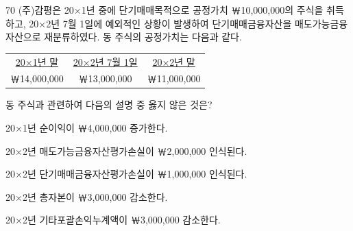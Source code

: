 \begin{question}{70}
(주)감평은 20×1년 중에 단기매매목적으로 공정가치 ￦10,000,000의 주식을 취득하고, 20×2년 7월 1일에 예외적인 상황이 발생하여 단기매매금융자산을 매도가능금융자산으로 재분류하였다. 동 주식의 공정가치는 다음과 같다.
\begin{framedtext}
\centering\begin{tabular}{ccc}
\uline{20×1년 말} & \uline{20×2년 7월 1일} & \uline{20×2년 말} \\
￦14,000,000 & ￦13,000,000 & ￦11,000,000
\end{tabular}\par
\end{framedtext}
동 주식과 관련하여 다음의 설명 중 옳지 않은 것은?
\begin{choices}
  \item 20×1년 순이익이 ￦4,000,000 증가한다.
  \item 20×2년 매도가능금융자산평가손실이 ￦2,000,000 인식된다.
  \item 20×2년 단기매매금융자산평가손실이 ￦1,000,000 인식된다.
  \item 20×2년 총자본이 ￦3,000,000 감소한다.
  \item 20×2년 기타포괄손익누계액이 ￦3,000,000 감소한다.
\end{choices}
\end{question}
